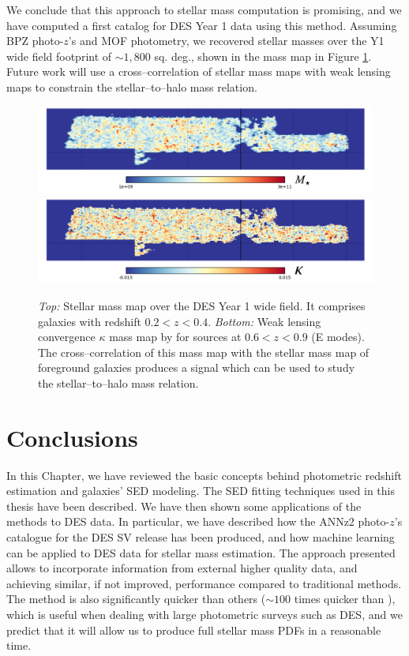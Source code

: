We conclude that this approach to stellar mass computation is promising, and we have computed a first catalog for DES Year 1 data using this method. Assuming BPZ photo-$z$'s and MOF photometry, we recovered stellar masses over the Y1 wide field footprint of $\sim 1,800$ sq. deg., shown in the mass map in Figure \ref{fig:massmap}. Future work will use a cross--correlation of stellar mass maps with weak lensing maps to constrain the stellar--to--halo mass relation.

\begin{figure}\centering \includegraphics[width=1\textwidth]{./chapters/chapter2/figs/smass_map.png}
 \includegraphics[width=1\textwidth]{./chapters/chapter2/figs/wl_mass_map.png}
\caption{\emph{Top:} Stellar mass map over the DES Year 1 wide field. It comprises galaxies with redshift $0.2<z<0.4$. \emph{Bottom:} Weak lensing convergence $\kappa$ mass map by \citet{2018MNRAS.475.3165C} for sources at $0.6<z<0.9$ (E modes). The cross--correlation of this mass map with the stellar mass map of foreground galaxies produces a signal which can be used to study the stellar--to--halo mass relation.}\label{fig:massmap}\end{figure}


\section{Conclusions}

In this Chapter, we have reviewed the basic concepts behind photometric redshift estimation and galaxies' SED modeling. The SED fitting techniques used in this thesis have been described. We have then shown some applications of the methods to DES data. In particular, we have described how the ANNz2 photo-$z$'s catalogue for the DES SV release has been produced, and how machine learning can be applied to DES data for stellar mass estimation. The approach presented allows to incorporate information from external higher quality data, and achieving similar, if not improved, performance compared to traditional methods. The method is also significantly quicker than others ($\sim 100$ times quicker than ), which is useful when dealing with large photometric surveys such as DES, and we predict that it will allow us to produce full stellar mass PDFs in a reasonable time.

